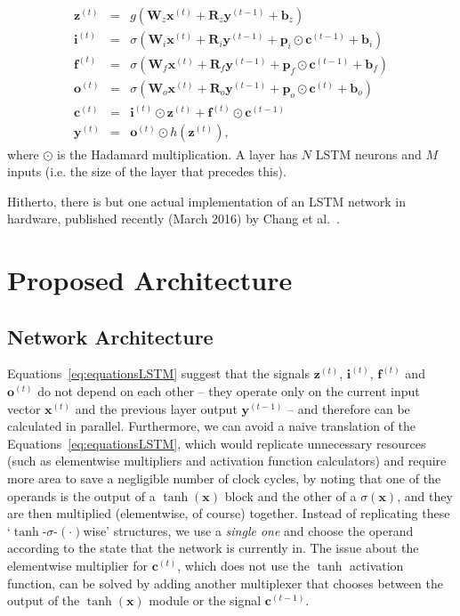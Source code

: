\documentclass{IEEEtran}
\newcommand{\mb}[1]{\mathbf{#1}}
\begin{document}
\begin{eqnarray}
    \mb{z}^{(t)} & = & g(\mb{W}_z \mb{x}^{(t)} + \mb{R}_z \mb{y}^{(t-1)} + \mb{b}_z) \nonumber\\
    \mb{i}^{(t)} & = & \sigma(\mb{W}_i \mb{x}^{(t)} + \mb{R}_i \mb{y}^{(t-1)} + \mb{p}_i \odot \mb{c}^{(t-1)} + \mb{b}_i) \nonumber\\
    \mb{f}^{(t)} & = & \sigma(\mb{W}_f \mb{x}^{(t)} + \mb{R}_f \mb{y}^{(t-1)} + \mb{p}_f \odot \mb{c}^{(t-1)} + \mb{b}_f) \nonumber\\
    \mb{o}^{(t)} & = & \sigma(\mb{W}_o \mb{x}^{(t)} + \mb{R}_o \mb{y}^{(t-1)} + \mb{p}_o \odot \mb{c}^{(t)} + \mb{b}_o) \nonumber\\
    \mb{c}^{(t)} & = & \mb{i}^{(t)} \odot \mb{z}^{(t)} + \mb{f}^{(t)} \odot \mb{c}^{(t-1)} \nonumber \\
    \mb{y}^{(t)} & = & \mb{o}^{(t)} \odot h(\mb{z}^{(t)}) \label{eq:equationsLSTM},
\end{eqnarray}
where $\odot$ is the Hadamard multiplication. A layer has $N$ LSTM neurons and $M$ inputs (i.e. the size of the layer that
precedes this).

Hitherto, there is but one actual implementation of an LSTM network in hardware, published recently
(March 2016) by Chang et al.~\cite{Chang15}.

\section{Proposed Architecture}\label{sec:proparch}

\subsection{Network Architecture}\label{sec:proprarch_net}
Equations~\ref{eq:equationsLSTM} suggest that the signals $\mb{z}^{(t)}$, $\mb{i}^{(t)}$, $\mb{f}^{(t)}$ and $\mb{o}^{(t)}$ do not depend on each other -- they
operate only on the current input vector $\mb{x}^{(t)}$ and the previous layer output $\mb{y}^{(t-1)}$ -- and therefore can be calculated in parallel. Furthermore, we
can avoid a naive translation of the Equations~\ref{eq:equationsLSTM}, which would replicate unnecessary resources (such as elementwise multipliers
and activation function calculators) and require more area to save a negligible number of clock cycles, by noting that one of the operands is the output
of a $\tanh(\mb{x})$ block and the other of a $\sigma(\mb{x})$, and they are then multiplied (elementwise, of course) together. Instead of replicating
these `$\tanh$-$\sigma$-$(\cdot)$wise' structures, we use a \emph{single one} and choose the operand according to the state that the network is currently in. The
issue about the elementwise multiplier for $\mb{c}^{(t)}$, which does not use the $\tanh$ activation function, can be solved by adding another multiplexer that chooses
between the output of the $\tanh(\mb{x})$ module or the signal $\mb{c}^{(t-1)}$.
\end{document}

